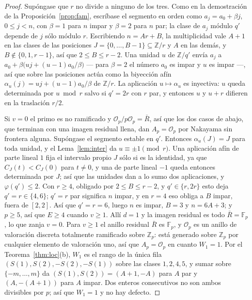 \documentclass[11pt,a4paper]{article}
\theoremstyle{definition}
\newcommand{\ZZ}{\mathbb{Z}}
\newcommand{\FF}{\mathbb{F}}
\newcommand{\cO}{\mathcal{O}}
\begin{document}
\begin{proof}
Sup\'ongase que $r$ no divide a ninguno de los tres. Como en la demostraci\'on de la
Proposici\'on~\ref{prop:fam}, escr\'ibase el segmento en orden como $a_j=a_0+\beta j$, $0\le j<n$,
con $\beta=1$ para $n$ impar y $\beta=2$ para $n$ par; la clase de $a_j$ m\'odulo $q'$ depende de
$j$ s\'olo m\'odulo $r$. Escribiendo $n=Ar+B$, la multiplicidad vale $A+1$ en las clases de las
posiciones $J=\{0,\dots,B-1\}\subseteq\ZZ/r$ y $A$ en las dem\'as, y $B\notin\{0,1,r-1\}$, as\'i
que $2\le B\le r-2$. Una unidad $u$ de $\ZZ/q'$ env\'ia $a_j$ a
$a_0+\beta\bigl(uj+(u-1)a_0/\beta\bigr)$ --- para $\beta=2$ el n\'umero $a_0$ es impar y $u$ es
impar ---, as\'i que sobre las posiciones act\'ua como la biyecci\'on af\'in
$\alpha_u(j)=uj+(u-1)a_0/\beta$ de $\ZZ/r$. La aplicaci\'on $u\mapsto\alpha_u$ es inyectiva: $u$
queda determinada por $u\bmod r$ salvo si $q'=2r$ con $r$ par, y entonces $u$ y $u+r$ difieren en
la traslaci\'on $r/2$.

Si $v=0$ el primo es no ramificado y $\cO_p/p\cO_p=\bar R$, as\'i que los dos casos de abajo, que
terminan con una imagen residual llena, dan $A_p=\cO_p$ por Nakayama sin frontera alguna.
Sup\'ongase el segmento estable en $q'$. Entonces $\alpha_u(J)=J$ para toda unidad, y el
Lema~\ref{lem:inter} da $u\equiv\pm1\pmod r$. Una aplicaci\'on af\'in de parte lineal $1$ fija el
intervalo propio $J$ s\'olo si es la identidad, ya que $C_J(t)<C_J(0)$ para $t\ne0$, y una de parte
lineal $-1$ queda entonces determinada por $J$; as\'i que las unidades dan a lo sumo dos
aplicaciones, y $\varphi(q')\le2$. Con $r\ge4$, obligado por $2\le B\le r-2$, y $q'\in\{r,2r\}$
esto deja $q'=r\in\{4,6\}$; $q'=r$ par significa $n$ impar, y en $r=4$ eso obliga a $B$ impar,
fuera de $[2,2]$. As\'i que $q'=r=6$, luego $n$ es impar, $B=3$ y $n=6A+3$; y $p\ge5$, as\'i que
$E\ge4$ cuando $v\ge1$. All\'i $d=1$ y la imagen residual es todo $\bar R=\FF_p$, lo que zanja
$v=0$. Para $v\ge1$ el anillo residual $\bar R$ es $\FF_p$, y $\cO_p$ es un anillo de valoraci\'on
discreta totalmente ramificado sobre $\ZZ_p$: est\'a generado sobre $\ZZ_p$ por cualquier elemento
de valoraci\'on uno, as\'i que $A_p=\cO_p$ en cuanto $W_1=1$. Por el Teorema~\ref{thm:loc}(b),
$W_1$ es el rango de la \'unica fila $(S(1),S(2),-S(2),-S(1))$ sobre las clases $1,2,4,5$, y sumar
sobre $\{-m,\dots,m\}$ da $(S(1),S(2))=(A+1,-A)$ para $A$ par y $(A,-(A+1))$ para $A$ impar. Dos
enteros consecutivos no son ambos divisibles por $p$; as\'i que $W_1=1$ y no hay defecto.


\end{proof}
\end{document}
